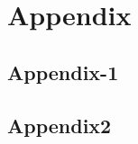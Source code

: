 \documentclass{article} %
\begin{document}
\newpage
\section{Appendix}


\subsection{Appendix-1}
\label{sec:Appendix1}
 

\subsection{Appendix2}
\label{Appendix2}
\end{document}
